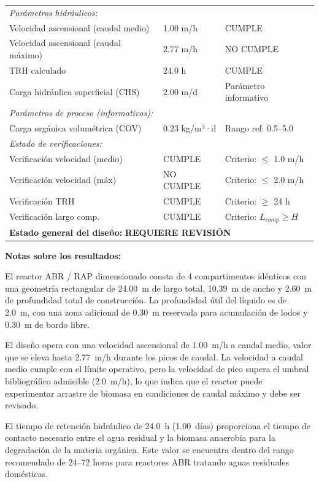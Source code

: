 \documentclass[12pt,a4paper]{article}
\begin{document}
\begin{longtable}{p{6cm}p{3cm}p{5cm}}
\multicolumn{3}{l}{\textit{Parámetros hidráulicos:}} \\
Velocidad ascensional (caudal medio) & 1.00 m/h & CUMPLE \\
Velocidad ascensional (caudal máximo) & 2.77 m/h & NO CUMPLE \\
TRH calculado & 24.0 h & CUMPLE \\
Carga hidráulica superficial (CHS) & 2.00 m/d & Parámetro informativo \\
\midrule

\multicolumn{3}{l}{\textit{Parámetros de proceso (informativos):}} \\
Carga orgánica volumétrica (COV) & 0.23 kg/m³·d & Rango ref: 0.5--5.0 \\
\midrule

\multicolumn{3}{l}{\textit{Estado de verificaciones:}} \\
Verificación velocidad (medio) & CUMPLE & Criterio: $\leq$ 1.0 m/h \\
Verificación velocidad (máx) & NO CUMPLE & Criterio: $\leq$ 2.0 m/h \\
Verificación TRH & CUMPLE & Criterio: $\geq$ 24 h \\
Verificación largo comp. & CUMPLE & Criterio: $L_{comp} \geq H$ \\
\bottomrule
\multicolumn{3}{l}{\textbf{Estado general del diseño:} \textbf{REQUIERE REVISIÓN}} \\
\end{longtable}

\textbf{Notas sobre los resultados:}

El reactor ABR / RAP dimensionado consta de 4 compartimentos idénticos con una geometría rectangular de 24.00~m de largo total, 10.39~m de ancho y 2.60~m de profundidad total de construcción. La profundidad útil del líquido es de 2.0~m, con una zona adicional de 0.30~m reservada para acumulación de lodos y 0.30~m de bordo libre.

El diseño opera con una velocidad ascensional de 1.00~m/h a caudal medio, valor que se eleva hasta 2.77~m/h durante los picos de caudal. La velocidad a caudal medio cumple con el límite operativo, pero la velocidad de pico supera el umbral bibliográfico admisible (2.0~m/h), lo que indica que el reactor puede experimentar arrastre de biomasa en condiciones de caudal máximo y debe ser revisado.

El tiempo de retención hidráulico de 24.0~h (1.00~días) proporciona el tiempo de contacto necesario entre el agua residual y la biomasa anaerobia para la degradación de la materia orgánica. Este valor se encuentra dentro del rango recomendado de 24--72 horas para reactores ABR tratando aguas residuales domésticas.
\end{document}
